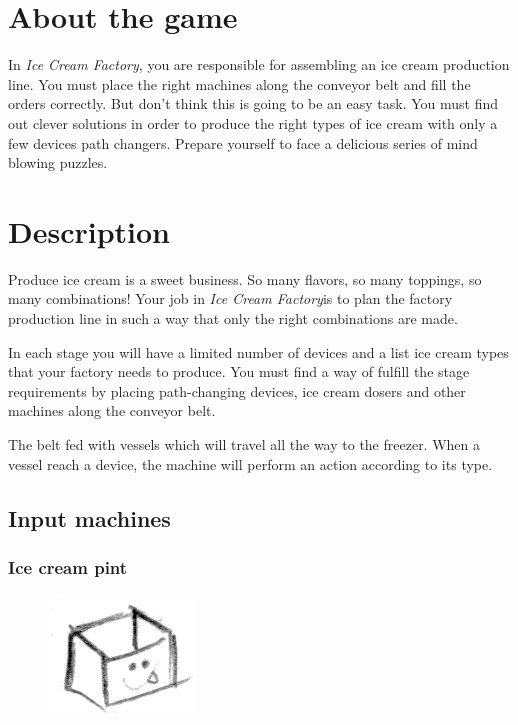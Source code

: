 \documentclass[a4paper]{scrartcl}
\title{\gamename}
\subtitle{Game Design Document}
\author{}
\date{\today}
\begin{document}
\newcommand{\gamename}{\emph{Ice Cream Factory}}

\maketitle

\section{About the game}
    In \gamename, you are responsible for assembling an ice cream production
    line. You must place the right machines along the conveyor belt and fill the
    orders correctly. But don't think this is going to be an easy task. You must
    find out clever solutions in order to produce the right types of ice cream
    with only a few devices path changers. Prepare yourself to face a delicious
    series of mind blowing puzzles.

\section{Description}
    Produce ice cream is a sweet business. So many flavors, so many toppings, so
    many combinations! Your job in \gamename is to plan the factory production
    line in such a way that only the right combinations are made.

    In each stage you will have a limited number of devices and a list ice cream
    types that your factory needs to produce. You must find a way of fulfill the
    stage requirements by placing path-changing devices, ice cream dosers and
    other machines along the conveyor belt.

    The belt fed with vessels which will travel all the way to the freezer. When
    a vessel reach a device, the machine will perform an action according to its
    type.

    \subsection{Input machines}
        \subsubsection{Ice cream pint}
            \begin{figure}
                \vspace{-20pt}
                \includegraphics[scale=1]{devices/pint}
                \vspace{-20pt}
            \end{figure}
            
\end{document}

